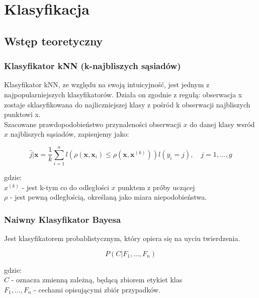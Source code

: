 \section{Klasyfikacja}
\subsection{Wstęp teoretyczny}
\subsubsection{Klasyfikator kNN (k-najbliszych sąsiadów)}
Klasyfikator kNN, ze względu na swoją intuicyjność, jest jednym z najpopularniejszych klasyfikatorów. Działa on zgodnie z regułą: obserwacja x zostaje sklasyfikowana do najliczniejszej klasy z pośród k obserwacji najbliszych punktowi x.\\

Szacowane prawdopodobieństwo przynaleności obserwacji ${x}$ do danej klasy wsród ${x}$ najbliszych sąsiadów, zapisujemy jako:

\begin{equation}
    \hat{j}|\mathbf{x} = \frac{1}{k} \sum_{i=1}^{n} l\left( \rho(\mathbf{x}, \mathbf{x}_i) \leq \rho(\mathbf{x}, \mathbf{x}^{(k)}) \right) l(y_i = j), \quad j = 1, \ldots, g
\end{equation}

gdzie:\\
${x}^{(k)}$ - jest k-tym co do odległości ${x}$ punktem z próby uczącej\\
$\rho$ - jest pewną odległością, określaną jako miara niepodobieństwa.

\subsubsection{Naiwny Klasyfikator Bayesa}
Jest klasyfikatorem probablistycznym, który opiera się na uyciu twierdzenia.

\begin{equation}
P(C|F_1, \ldots, F_n)
\end{equation}

gdzie:\\
$C$ - oznacza zmienną zależną, będącą zbiorem etykiet klas\\
 $F_1, \ldots, F_n$ - cechami opisującymi zbiór przypadków.
